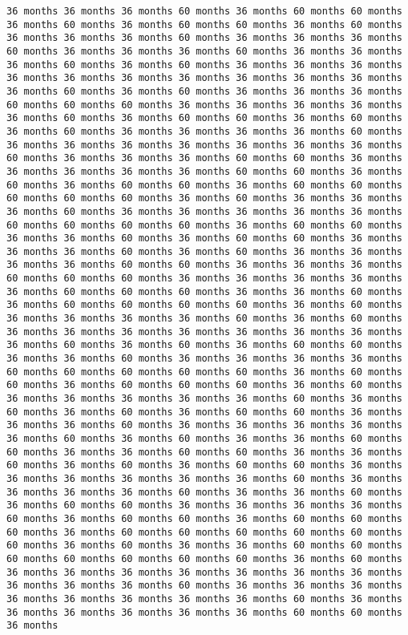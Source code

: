 \documentclass[11pt]{article}
\begin{document}
\begin{Verbatim}[commandchars=\\\{\}, frame=single, framerule=2mm, rulecolor=\color{outerrorbackground}]
36 months 36 months 36 months 60 months 36 months 60 months 60 months 36 months 60 months 36 months 60 months 60 months 36 months 60 months 36 months 36 months 36 months 60 months 36 months 36 months 36 months 60 months 36 months 36 months 36 months 60 months 36 months 36 months 36 months 60 months 36 months 60 months 36 months 36 months 36 months 36 months 36 months 36 months 36 months 36 months 36 months 36 months 36 months 60 months 36 months 60 months 36 months 36 months 36 months 60 months 60 months 60 months 36 months 36 months 36 months 36 months 36 months 60 months 36 months 60 months 60 months 36 months 60 months 36 months 60 months 36 months 36 months 36 months 36 months 60 months 36 months 36 months 36 months 36 months 36 months 36 months 36 months 60 months 36 months 36 months 36 months 60 months 60 months 36 months 36 months 36 months 36 months 36 months 60 months 60 months 36 months 60 months 36 months 60 months 60 months 36 months 60 months 60 months 60 months 60 months 60 months 36 months 60 months 36 months 36 months 36 months 60 months 36 months 36 months 36 months 36 months 36 months 60 months 60 months 60 months 60 months 36 months 60 months 60 months 36 months 36 months 60 months 36 months 60 months 60 months 36 months 36 months 36 months 60 months 36 months 60 months 36 months 36 months 36 months 36 months 60 months 60 months 36 months 36 months 36 months 60 months 60 months 60 months 36 months 36 months 36 months 36 months 36 months 60 months 60 months 60 months 36 months 36 months 60 months 36 months 60 months 60 months 60 months 60 months 36 months 60 months 36 months 36 months 36 months 36 months 60 months 36 months 60 months 36 months 36 months 36 months 36 months 36 months 36 months 36 months 36 months 60 months 36 months 60 months 36 months 60 months 60 months 36 months 36 months 60 months 36 months 36 months 36 months 36 months 60 months 60 months 60 months 60 months 60 months 36 months 60 months 60 months 36 months 60 months 60 months 60 months 36 months 60 months 36 months 36 months 36 months 36 months 36 months 60 months 36 months 60 months 36 months 60 months 36 months 60 months 60 months 36 months 36 months 36 months 60 months 36 months 36 months 36 months 36 months 36 months 60 months 36 months 60 months 36 months 36 months 60 months 60 months 36 months 36 months 60 months 60 months 36 months 36 months 60 months 36 months 60 months 36 months 60 months 60 months 36 months 36 months 36 months 36 months 36 months 36 months 60 months 36 months 36 months 36 months 36 months 60 months 36 months 36 months 60 months 36 months 60 months 60 months 36 months 36 months 36 months 36 months 60 months 36 months 60 months 60 months 36 months 60 months 60 months 60 months 36 months 60 months 60 months 60 months 60 months 60 months 60 months 36 months 60 months 36 months 36 months 60 months 60 months 60 months 60 months 60 months 60 months 60 months 36 months 60 months 36 months 36 months 36 months 36 months 36 months 36 months 36 months 36 months 36 months 36 months 60 months 36 months 36 months 36 months 36 months 36 months 36 months 36 months 36 months 60 months 36 months 36 months 36 months 36 months 36 months 36 months 60 months 60 months 36 months 
\end{Verbatim}
\end{document}
